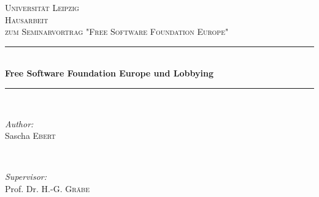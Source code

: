 \begin{titlepage}

\newcommand{\HRule}{\rule{\linewidth}{0.5mm}} %

\center %


\textsc{\LARGE Universität Leipzig}\\[1.5cm] %
\textsc{\Large Hausarbeit}\\[0.5cm] %
\textsc{\large zum Seminarvortrag "Free Software Foundation Europe"}\\[0.5cm] %


\HRule \\[0.4cm]
{ \LARGE \bfseries Free Software Foundation Europe und Lobbying}\\[0.4cm]
\HRule \\[1.5cm]


\begin{minipage}{0.4\textwidth}
\begin{flushleft} \large
\emph{Author:}\\
Sascha \textsc{Ebert} %
\end{flushleft}
\end{minipage}
~
\begin{minipage}{0.4\textwidth}
\begin{flushright} \large
\emph{Supervisor:} \\
Prof. Dr. H.-G. \textsc{Gräbe} %
\end{flushright}
\end{minipage}\\[4cm]



\end{titlepage}

